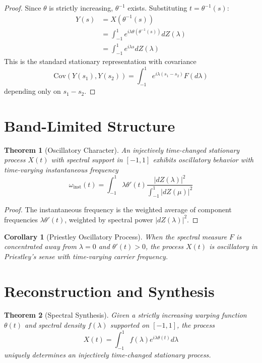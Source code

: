 \documentclass[11pt]{article}
\newtheorem{theorem}{Theorem}
\newtheorem{corollary}{Corollary}
\begin{document}
\begin{proof}
Since $\theta$ is strictly increasing, $\theta^{-1}$ exists. Substituting $t = \theta^{-1}(s)$:
\begin{align}
Y(s) &= X(\theta^{-1}(s))\\
&= \int_{-1}^1 e^{i\lambda\theta(\theta^{-1}(s))} dZ(\lambda)\\
&= \int_{-1}^1 e^{i\lambda s} dZ(\lambda)
\end{align}
This is the standard stationary representation with covariance
\begin{equation}
\text{Cov}(Y(s_1),Y(s_2)) = \int_{-1}^1 e^{i\lambda(s_1-s_2)} F(d\lambda)
\end{equation}
depending only on $s_1-s_2$.
\end{proof}

\section{Band-Limited Structure}

\begin{theorem}[Oscillatory Character]
An injectively time-changed stationary process $X(t)$ with spectral support in $[-1,1]$ exhibits oscillatory behavior with time-varying instantaneous frequency
\begin{equation}
\omega_{\text{inst}}(t) = \int_{-1}^1 \lambda\theta'(t) \frac{|dZ(\lambda)|^2}{\int_{-1}^1 |dZ(\mu)|^2}
\end{equation}
\end{theorem}

\begin{proof}
The instantaneous frequency is the weighted average of component frequencies $\lambda\theta'(t)$, weighted by spectral power $|dZ(\lambda)|^2$.
\end{proof}

\begin{corollary}[Priestley Oscillatory Process]
When the spectral measure $F$ is concentrated away from $\lambda = 0$ and $\theta'(t) > 0$, the process $X(t)$ is oscillatory in Priestley's sense with time-varying carrier frequency.
\end{corollary}

\section{Reconstruction and Synthesis}

\begin{theorem}[Spectral Synthesis]
Given a strictly increasing warping function $\theta(t)$ and spectral density $f(\lambda)$ supported on $[-1,1]$, the process
\begin{equation}
X(t) = \int_{-1}^1 f(\lambda) e^{i\lambda\theta(t)} d\lambda
\end{equation}
uniquely determines an injectively time-changed stationary process.
\end{theorem}
\end{document}
